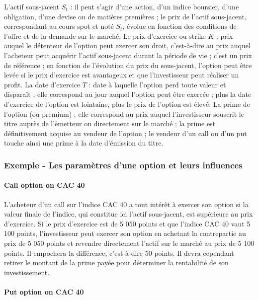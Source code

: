 \documentclass[a4paper, 12pt]{report}
\begin{document}
L’actif sous-jacent \( S_t \) : il peut s’agir d’une action, d’un indice boursier, d’une obligation, d’une devise ou de matières premières ; le prix de l’actif sous-jacent, correspondant au cours spot et noté \( S_t \), évolue en fonction des conditions de l’offre et de la demande sur le marché. Le prix d’exercice ou strike \( K \) : prix auquel le détenteur de l’option peut exercer son droit, c'est-à-dire au prix auquel l’acheteur peut acquérir l’actif sous-jacent durant la période de vie ; c’est un prix de référence ; en fonction de l’évolution du prix du sous-jacent, l’option peut être levée si le prix d’exercice est avantageux et que l’investisseur peut réaliser un profit. La date d’exercice \( T \) : date à laquelle l’option perd toute valeur et disparaît ; elle correspond au jour auquel l’option peut être exercée ; plus la date d’exercice de l’option est lointaine, plus le prix de l’option est élevé. La prime de l’option (ou premium) : elle correspond au prix auquel l’investisseur souscrit le titre auprès de l’émetteur ou directement sur le marché ; la prime est définitivement acquise au vendeur de l’option ; le vendeur d’un call ou d’un put touche ainsi une prime à la date d’émission du titre.

\subsubsection{Exemple - Les paramètres d’une option et leurs influences}

\paragraph{Call option on CAC 40}

L’acheteur d’un call sur l’indice CAC 40 a tout intérêt à exercer son option si la valeur finale de l’indice, qui constitue ici l’actif sous-jacent, est supérieure au prix d’exercice. Si le prix d’exercice est de 5 050 points et que l’indice CAC 40 vaut 5 100 points, l’investisseur peut exercer son option en achetant la contrepartie au prix de 5 050 points et revendre directement l’actif sur le marché au prix de 5 100 points. Il empochera la différence, c’est-à-dire 50 points. Il devra cependant retirer le montant de la prime payée pour déterminer la rentabilité de son investissement.

\paragraph{Put option on CAC 40}
\end{document}

